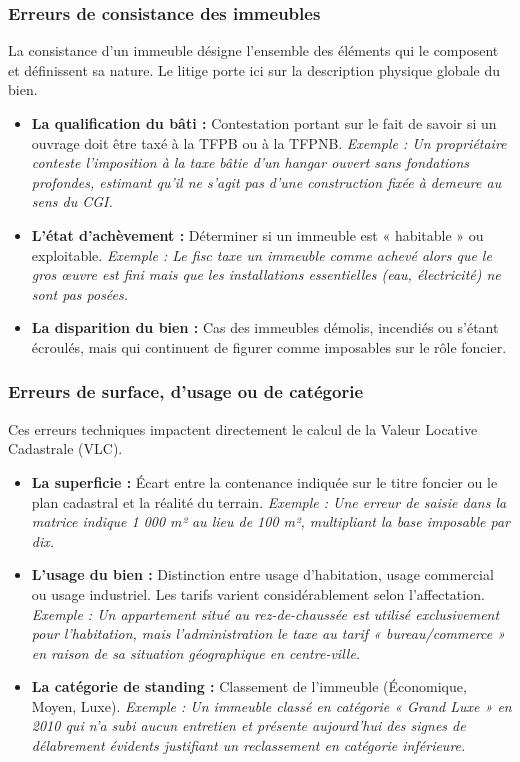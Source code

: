 \documentclass[Cours_contentieuxTF2026.tex]{subfiles}
\begin{document}
\subsubsection{Erreurs de consistance des immeubles}
La consistance d'un immeuble désigne l'ensemble des éléments qui le composent et définissent sa nature. Le litige porte ici sur la description physique globale du bien.

\begin{itemize}
	\item \textbf{La qualification du bâti :} Contestation portant sur le fait de savoir si un ouvrage doit être taxé à la TFPB ou à la TFPNB.
	\textit{Exemple : Un propriétaire conteste l'imposition à la taxe bâtie d'un hangar ouvert sans fondations profondes, estimant qu'il ne s'agit pas d'une construction fixée à demeure au sens du CGI.}
	
	\item \textbf{L'état d'achèvement :} Déterminer si un immeuble est « habitable » ou exploitable.
	\textit{Exemple : Le fisc taxe un immeuble comme achevé alors que le gros œuvre est fini mais que les installations essentielles (eau, électricité) ne sont pas posées.}
	
	\item \textbf{La disparition du bien :} Cas des immeubles démolis, incendiés ou s'étant écroulés, mais qui continuent de figurer comme imposables sur le rôle foncier.
\end{itemize}

\subsubsection{Erreurs de surface, d’usage ou de catégorie}
Ces erreurs techniques impactent directement le calcul de la Valeur Locative Cadastrale (VLC).

\begin{itemize}
	\item \textbf{La superficie :} Écart entre la contenance indiquée sur le titre foncier ou le plan cadastral et la réalité du terrain.
	\textit{Exemple : Une erreur de saisie dans la matrice indique 1 000 m² au lieu de 100 m², multipliant la base imposable par dix.}
	
	\item \textbf{L'usage du bien :} Distinction entre usage d'habitation, usage commercial ou usage industriel. Les tarifs varient considérablement selon l'affectation.
	\textit{Exemple : Un appartement situé au rez-de-chaussée est utilisé exclusivement pour l'habitation, mais l'administration le taxe au tarif « bureau/commerce » en raison de sa situation géographique en centre-ville.}
	
	\item \textbf{La catégorie de standing :} Classement de l'immeuble (Économique, Moyen, Luxe). 
	\textit{Exemple : Un immeuble classé en catégorie « Grand Luxe » en 2010 qui n'a subi aucun entretien et présente aujourd'hui des signes de délabrement évidents justifiant un reclassement en catégorie inférieure.}
\end{itemize}
\end{document}
